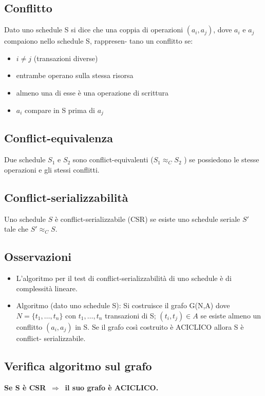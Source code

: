 \documentclass[a4paper, 10pt]{article}
\theoremstyle{definition}
\begin{document}
		\subsection{Conflitto}
			Dato uno schedule S si dice che una coppia di operazioni
			$ (a_i , a_j ) $, dove $ a_i $ e $ a_j $ compaiono nello schedule S, rappresen-
			tano un conflitto se:
			\begin{itemize}
				\item  $ i \neq j $ (transazioni diverse)
				\item entrambe operano sulla stessa risorsa
				\item almeno una di esse è una operazione di scrittura 
				\item $ a_i $ compare in S prima di $ a_j $
			\end{itemize}
			
		\subsection*{Conflict-equivalenza}
			Due schedule $ S_1 $ e $ S_2 $ sono conflict-equivalenti ($ S_1 \approx_C S_2 $ ) se
			possiedono le stesse operazioni e gli stessi conflitti.

		\subsection*{Conflict-serializzabilità}
			Uno schedule $ S $ è conflict-serializzabile (CSR) se esiste uno
			schedule seriale $ S' $ tale che $ S' \approx_C S $.
			
		\subsection*{Osservazioni}
			\begin{itemize}
				\item L'algoritmo per il test di conflict-serializzabilità di
				uno schedule è di complessità lineare.
				\item Algoritmo (dato uno schedule S):
					\subitem{-} Si costruisce il grafo G(N,A) dove $ N=\{t_1 , \dots, t_n \}  $ con $ t_1 , \dots, t_n $
					transazioni di S; $ (t_i , t_j ) \in A $ se esiste almeno
					un conflitto $ (a_i , a_j ) $
					in S.
					\subitem{-} Se il grafo così costruito è ACICLICO allora S è conflict-
					serializzabile.
			\end{itemize}
			
		\subsection*{Verifica algoritmo sul grafo}
			\textbf{Se S è CSR $\, \Rightarrow\, $ il suo grafo è ACICLICO.}
			
\end{document}
